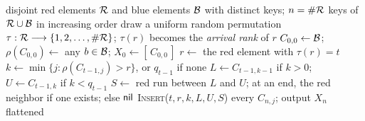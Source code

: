 \begin{myalgorithm}
\begin{algorithmic}[1]
\REQUIRE disjoint red elements $\mathcal R$ and blue elements $\mathcal B$ with distinct keys; $n = \#\mathcal R$
\ENSURE keys of $\mathcal R \cup \mathcal B$ in increasing order
\STATE draw a uniform random permutation $\tau:\mathcal R\longrightarrow\{1,2,\dots,\#\mathcal R\}$; $\tau(r)$ becomes the {\em arrival rank} of $r$
\STATE $C_{0,0} \gets \mathcal B$; $\rho(C_{0,0}) \gets $ any $b \in \mathcal B$; $X_0 \gets [\,C_{0,0}\,]$
  \STATE $r \gets $ the red element with $\tau(r) = t$
  \STATE $k \gets \min\{j : \rho(C_{t-1,j}) > r\}$, or $q_{t-1}$ if none
  \STATE $L \gets C_{t-1,k-1}$ if $k > 0$; $U \gets C_{t-1,k}$ if $k < q_{t-1}$
  \STATE $S \gets$ red run between $L$ and $U$; at an end, the red neighbor if one exists; else $\textsf{nil}$
  \STATE \textsc{Insert}($t, r, k, L, U, S$)
\ENDFOR
{} every $C_{n,j}$; output $X_n$ flattened
\end{algorithmic}
\end{myalgorithm}
